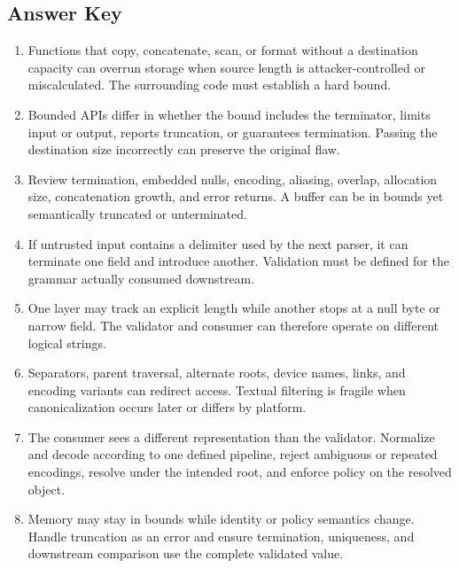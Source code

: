 \documentclass[11pt,letterpaper]{article}
\begin{document}
\subsection*{Answer Key}
\begin{enumerate}
\item Functions that copy, concatenate, scan, or format without a destination capacity can overrun storage when source length is attacker-controlled or miscalculated. The surrounding code must establish a hard bound.
\item Bounded APIs differ in whether the bound includes the terminator, limits input or output, reports truncation, or guarantees termination. Passing the destination size incorrectly can preserve the original flaw.
\item Review termination, embedded nulls, encoding, aliasing, overlap, allocation size, concatenation growth, and error returns. A buffer can be in bounds yet semantically truncated or unterminated.
\item If untrusted input contains a delimiter used by the next parser, it can terminate one field and introduce another. Validation must be defined for the grammar actually consumed downstream.
\item One layer may track an explicit length while another stops at a null byte or narrow field. The validator and consumer can therefore operate on different logical strings.
\item Separators, parent traversal, alternate roots, device names, links, and encoding variants can redirect access. Textual filtering is fragile when canonicalization occurs later or differs by platform.
\item The consumer sees a different representation than the validator. Normalize and decode according to one defined pipeline, reject ambiguous or repeated encodings, resolve under the intended root, and enforce policy on the resolved object.
\item Memory may stay in bounds while identity or policy semantics change. Handle truncation as an error and ensure termination, uniqueness, and downstream comparison use the complete validated value.
\end{enumerate}
\end{document}
